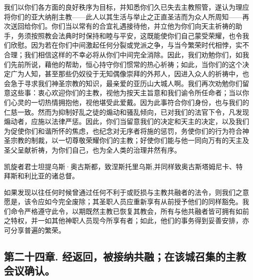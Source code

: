 我们以你们各方面的良好秩序为目标，并知悉你们久已失去主教照管，遂认为理应将你们的亚大纳削主教——此人以其生活与举止之正直圣洁而为众人所周知——再次送回给你们。你们当以常有的合宜礼遇接待他，并立他为你们向天主祈祷的助手，务须按照教会法典时时保持和睦与平安，这既能使你们自己蒙受荣耀，也令我们欣慰。因为若在你们中间激起任何分裂或党派之争，与当今繁荣时代相悖，实不合理；我们相信这样的不幸必将从你们中间完全消除。因此，我们劝勉你们，如我们先前所说，藉他的帮助，恒心持守你们惯常的热心祈祷；如此，当你们的这个决定广为人知，甚至那些仍奴役于无知偶像崇拜的外邦人，因进入众人的祈祷中，也会急于寻求我们神圣宗教的知识，最亲爱的亚历山大城人啊。我们再次劝勉你们留意这些事：衷心欢迎你们的主教，视他为按天主旨意和我们谕令所任命者；当以你们心灵的一切热情拥抱他，视他堪受此爱戴。因为此事符合你们身份，也与我们的仁慈一致。然而为抑制好乱之徒的煽动和骚乱倾向，已对我们的法官下令，凡发现煽动者，应施以法律严惩。因此，你们当留意我们的决定和天主的决定，以及我们为促使你们和谐所怀的焦虑，也纪念对无序者将施的惩罚，务使你们的行为符合神圣宗教的制裁，以一切尊敬荣耀你们的主教；好使你们能与他一同向万有的天主及圣父呈献祈祷，为你们自己，也为全人类的治理井然有序。\par

\par

凯旋者君士坦提乌斯·奥古斯都，致涅斯托里乌斯,并同样致奥古斯塔姆尼卡、特拜斯和利比亚的诸总督。\par

如果发现以往任何时候曾通过任何不利于或贬损与主教共融者的法令，则我们之意愿是，该令应如今完全废除；其圣职人员应重新享有从前授予他们的同样豁免。我们命令严格遵守此令，以期既然主教已恢复其教会，所有与他共融者皆可拥有如前之特权，并一如其他神职人员现今所享有者；如此，他们的事务得到妥善安排，亦可分享普遍的繁荣。\par


\subsection{第二十四章. 经返回，被接纳共融；在该城召集的主教会议确认。}

